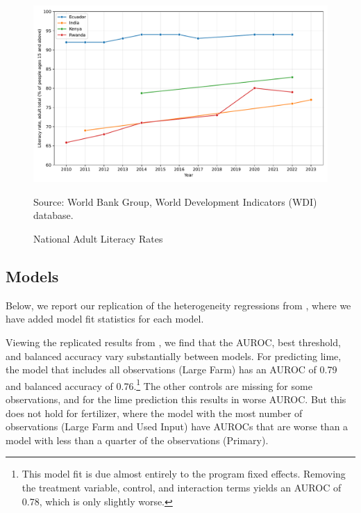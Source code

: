 \documentclass[12pt]{article}
\begin{document}
\begin{figure}[H]
    \centering
    \caption{National Adult Literacy Rates}
    \includegraphics[width=\textwidth]{../output/literacy_rate.pdf}
    \begin{minipage}{0.9\textwidth}
    \footnotesize
    Source: World Bank Group, World Development Indicators (WDI) database. 
    \end{minipage}
    \label{fig:literacy_rate}
\end{figure}

\subsection{Models}
Below, we report our replication of the heterogeneity regressions from \textcite{fabregas_digital_2025}, where we have added model fit statistics for each model.




Viewing the replicated results from \textcite{fabregas_digital_2025}, we find that the AUROC, best threshold, and balanced accuracy vary substantially between models. For predicting lime, the model that includes all observations (Large Farm) has an AUROC of 0.79 and balanced accuracy of 0.76.\footnote{This model fit is due almost entirely to the program fixed effects. Removing the treatment variable, control, and interaction terms yields an AUROC of 0.78, which is only slightly worse.} The other controls are missing for some observations, and for the lime prediction this results in worse AUROC. But this does not hold for fertilizer, where the model with the most number of observations (Large Farm and Used Input) have AUROCs that are worse than a model with less than a quarter of the observations (Primary).
\end{document}
